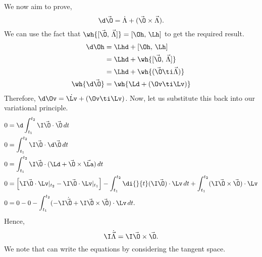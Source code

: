 \noindent
We now aim to prove,
$$ \d\vec\O = \dot\Lambda + (\vec\O \times \vec\Lambda). $$
We can use the fact that $\wh{[\vec\O,\,\vec\Lambda]} = [\Oh,\,\Lh]$ to get the required result.
\begin{align*}
  \d\Oh &= \Lhd + [\Oh,\,\Lh] \\
  &= \Lhd + \wh{[\vec\O,\,\vec\Lambda]} \\
  &= \Lhd + \wh{(\vec\O \ti \vec\Lambda)} \\
  \wh{\d\vec\O} &= \wh{\Ld + (\Ov \ti \Lv)} \\
\end{align*}
Therefore, $\d\Ov = \dot\Lv + (\Ov \ti \Lv)$. Now, let us substitute this back into our variational principle.
\begin{align*}
  0 &= \d\int_{t_1}^{t_2} \I \vec\O \cdot \vec\O \,dt \\
  0 &= \int_{t_1}^{t_2}\I \vec\O \cdot \d\vec\O \,dt \\
  0 &= \int_{t_1}^{t_2} {\I \vec\O \cdot (\Ld + \vec\O \times \vec\La)\,dt} \\
  0 &= \left[ \I\vec\O \cdot \Lv |_{t_2} - \I\vec\O \cdot \Lv |_{t_1} \right] - \int_{t_1}^{t_2} \di{}{t}(\I\vec\O) \cdot \Lv\,dt + \int_{t_1}^{t_2} (\I\vec\O \times \vec\O)\cdot \Lv\\
  0 &= 0 - 0 - \int_{t_1}^{t_2} (- \I\dot{\vec\O} + \I\vec\O \times \vec\O) \cdot \Lv \, dt.
\end{align*}
Hence,
$$ \I\dot{\vec \Lambda} = \I\vec\O \times \vec\O. $$
We note that can write the equations by considering the tangent space.

